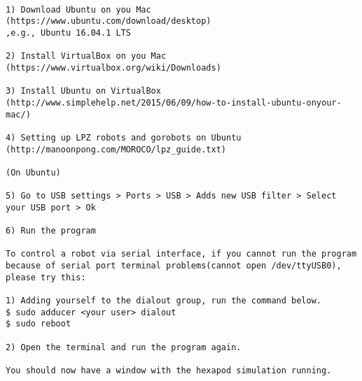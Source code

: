 \begin{lstlisting}

1) Download Ubuntu on you Mac (https://www.ubuntu.com/download/desktop)
,e.g., Ubuntu 16.04.1 LTS

2) Install VirtualBox on you Mac (https://www.virtualbox.org/wiki/Downloads)

3) Install Ubuntu on VirtualBox 
(http://www.simplehelp.net/2015/06/09/how-to-install-ubuntu-onyour-mac/)

4) Setting up LPZ robots and gorobots on Ubuntu
(http://manoonpong.com/MOROCO/lpz_guide.txt)

(On Ubuntu)

5) Go to USB settings > Ports > USB > Adds new USB filter > Select your USB port > Ok

6) Run the program

To control a robot via serial interface, if you cannot run the program
because of serial port terminal problems(cannot open /dev/ttyUSB0), please try this:

1) Adding yourself to the dialout group, run the command below.
$ sudo adducer <your user> dialout
$ sudo reboot

2) Open the terminal and run the program again.

You should now have a window with the hexapod simulation running.

\end{lstlisting}
